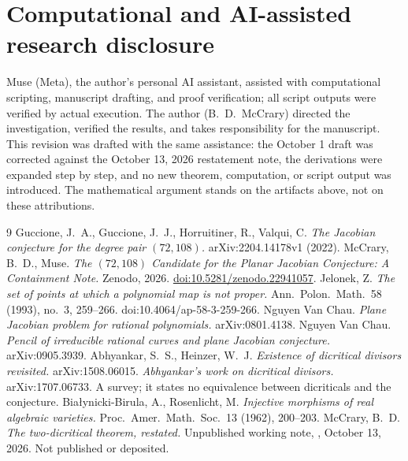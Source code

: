 \documentclass[a4paper,11pt]{article}
\newcommand{\filename}[1]{\texttt{\seqsplit{#1}}}
\theoremstyle{plain}
\theoremstyle{definition}
\theoremstyle{remark}
\begin{document}
\section{Computational and AI-assisted research disclosure}\label{sec:disclosure}

Muse (Meta), the author's personal AI assistant, assisted with computational scripting,
manuscript drafting, and proof verification; all script outputs were verified by actual
execution. The author (B.~D.~McCrary) directed the investigation, verified the results, and
takes responsibility for the manuscript. This revision was drafted with the same assistance:
the October 1 draft was corrected against the October 13, 2026 restatement note, the
derivations were expanded step by step, and no new theorem, computation, or script output
was introduced. The mathematical argument stands on the artifacts above, not on these
attributions.

\begin{thebibliography}{9}
 Guccione, J.~A., Guccione, J.~J., Horruitiner, R., Valqui, C. \textit{The Jacobian conjecture for the degree pair $(72,108)$.} arXiv:2204.14178v1 (2022).
 McCrary, B.~D., Muse. \textit{The $(72,108)$ Candidate for the Planar Jacobian Conjecture: A Containment Note.} Zenodo, 2026. \href{https://doi.org/10.5281/zenodo.22941057}{doi:10.5281/zenodo.22941057}.
 Jelonek, Z. \textit{The set of points at which a polynomial map is not proper.} Ann.\ Polon.\ Math.\ 58 (1993), no.~3, 259--266. doi:10.4064/ap-58-3-259-266.
 Nguyen Van Chau. \textit{Plane Jacobian problem for rational polynomials.} arXiv:0801.4138.
 Nguyen Van Chau. \textit{Pencil of irreducible rational curves and plane Jacobian conjecture.} arXiv:0905.3939.
 Abhyankar, S.~S., Heinzer, W.~J. \textit{Existence of dicritical divisors revisited.} arXiv:1508.06015.
 \textit{Abhyankar's work on dicritical divisors.} arXiv:1707.06733. A survey; it states no equivalence between dicriticals and the conjecture.
 Bia\l{}ynicki-Birula, A., Rosenlicht, M. \textit{Injective morphisms of real algebraic varieties.} Proc.\ Amer.\ Math.\ Soc.\ 13 (1962), 200--203.
 McCrary, B.~D. \textit{The two-dicritical theorem, restated.} Unpublished working note, \filename{branch\_two\_dicritical/RESTATEMENT.md}, October 13, 2026. Not published or deposited.
\end{thebibliography}
\end{document}
